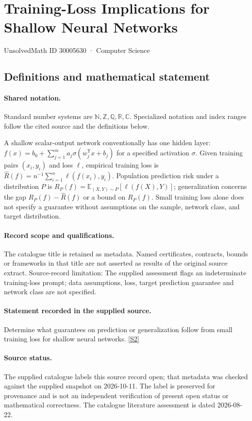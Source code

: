 \documentclass[11pt]{article}
\newcommand{\sref}[2]{\hyperlink{source:#1:#2}{[S#2]}}
\begin{document}
\setcounter{section}{30005629}
\section{Training-Loss Implications for Shallow Neural Networks}\label{30005630}
{\small\sffamily UnsolvedMath ID 30005630 · Computer Science}
\subsection{Definitions and mathematical statement}

\paragraph{Shared notation.}Standard number systems are $\mathbb N,\mathbb Z,\mathbb Q,\mathbb R,\mathbb C$. Specialized notation and index ranges follow the cited source and the definitions below.


A shallow scalar-output network conventionally has one hidden layer: $f(x)=b_0+\sum_{j=1}^m a_j\sigma(w_j^{\mathsf T}x+b_j)$ for a specified activation $\sigma$. Given training pairs $(x_i,y_i)$ and loss $\ell$, empirical training loss is $\widehat R(f)=n^{-1}\sum_{i=1}^n\ell(f(x_i),y_i)$. Population prediction risk under a distribution $P$ is $R_P(f)=\mathbb E_{(X,Y)\sim P}[\ell(f(X),Y)]$; generalization concerns the gap $R_P(f)-\widehat R(f)$ or a bound on $R_P(f)$. Small training loss alone does not specify a guarantee without assumptions on the sample, network class, and target distribution.
\paragraph{Record scope and qualifications.}
The catalogue title is retained as metadata. Named certificates, contracts, bounds or frameworks in that title are not asserted as results of the original source extract.
Source-record limitation: The supplied assessment flags an indeterminate training-loss prompt; data assumptions, loss, target prediction guarantee and network class are not specified.
\paragraph{Statement recorded in the supplied source.}
Determine what guarantees on prediction or generalization follow from small training loss for shallow neural networks. \sref{30005630}{2}
\paragraph{Source status.}
The supplied catalogue labels this source record open; that metadata was checked against the supplied snapshot on 2026-10-11. The label is preserved for provenance and is not an independent verification of present open status or mathematical correctness. The catalogue literature assessment is dated 2026-08-22.
\end{document}

